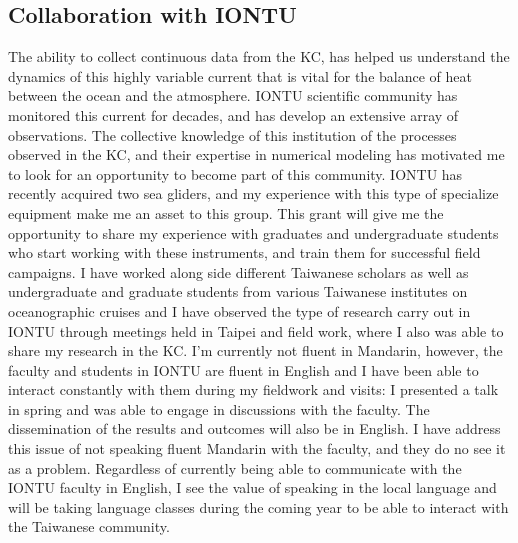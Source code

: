 \documentclass[letterpaper, 12pt ]{article}
\begin{document}
\subsection*{Collaboration with IONTU}

The ability to collect continuous data from the KC, has helped us understand the dynamics of this highly variable current that is vital for the balance of heat between the ocean and the atmosphere. IONTU scientific community has monitored this current for decades, and has develop an extensive array of observations. The collective knowledge of this institution of the processes observed in the KC, and their expertise in numerical modeling has motivated me to look for an opportunity to become part of this community. IONTU has recently acquired two sea gliders, and my experience with this type of specialize equipment make me an asset to this group. This grant will give me the opportunity to share my experience with graduates and undergraduate students who start working with these instruments, and train them for successful field campaigns.
\vspace{10pt}
I have worked along side different Taiwanese scholars as well as undergraduate and graduate students from various Taiwanese institutes on oceanographic cruises and I have observed the type of research carry out in IONTU through meetings held in Taipei and field work, where I also was able to share my research in the KC. I'm currently not fluent in Mandarin, however, the faculty and students in IONTU are fluent in English and I have been able to interact constantly with them during my fieldwork and visits: I presented a talk in spring and was able to engage in discussions with the faculty. The dissemination of the results and outcomes will also be in English. I have address this issue of not speaking fluent Mandarin with the faculty, and they do no see it as a problem. Regardless of currently being able to communicate with the IONTU faculty in English, I see the value of speaking in the local language and will be taking language classes during the coming year to be able to interact with the Taiwanese community.

\end{document}
